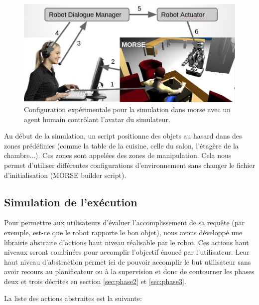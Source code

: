 \documentclass[a4paper,11pt,twoside]{StyleThese}
\begin{document}
\begin{figure}[ht!]
 \centering
  \includegraphics[width=0.89\linewidth]{./img/simusetup.jpg}
  \caption {Configuration expérimentale pour la simulation dans morse avec un agent humain contrôlant l'avatar du simulateur.}
  \label{fig:simusetup}
\end{figure}

 
Au début de la simulation, un script positionne des objets au hasard dans des zones prédéfinies (comme la table de la cuisine, celle du salon, l'étagère de la chambre...). Ces zones sont appelées des zones de manipulation. Cela nous permet d'utiliser différentes configurations d'environnement sans changer le fichier d'initialisation (MORSE builder script).

\subsection{Simulation de l'exécution}
\label{section:actions}
Pour permettre aux utilisateurs d'évaluer l'accomplissement de sa requête (par exemple, est-ce que le robot rapporte le bon objet), nous avons développé une librairie abstraite d'actions haut niveau réalisable par le robot. Ces actions haut niveaux seront combinées pour accomplir l'objectif énoncé par l'utilisateur. Leur haut niveau d'abstraction permet ici de pouvoir accomplir le but utilisateur sans avoir recours au planificateur ou à la supervision et donc de contourner les phases deux et trois décrites en section \ref{sec:phase2} et \ref{sec:phase3}.

La liste des actions abstraites est la suivante:
\end{document}
